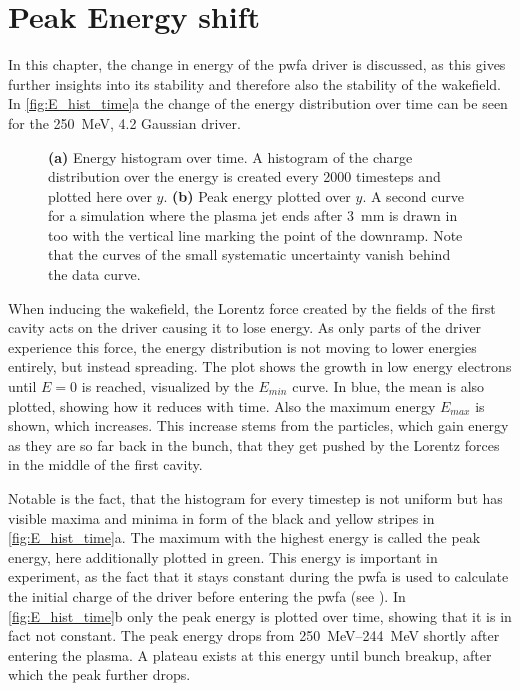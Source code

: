 \documentclass[bachelor_thesis]{subfiles}
\begin{document}
\section{Peak Energy shift} \label{chap:E_shift}
In this chapter, the change in energy of the \gls{pwfa} driver is discussed, as this gives further insights into its stability and therefore also the stability of the wakefield.
In \autoref{fig:E_hist_time}a the change of the energy distribution over time can be seen for the \qty{250}{\MeV}, \qty{4.2}{\mrad} Gaussian driver.
\begin{figure}
	\centering
	
	\caption{
	\textbf{(a)} Energy histogram over time. A histogram of the charge distribution over the energy is created every 2000 timesteps and plotted here over $y$.
	\textbf{(b)} Peak energy plotted over $y$. A second curve for a simulation where the plasma jet ends after \qty{3}{\mm} is drawn in too with the vertical line marking the point of the downramp. Note that the curves of the small systematic uncertainty vanish behind the data curve.}
	\label{fig:E_hist_time}
\end{figure}
When inducing the wakefield, the Lorentz force created by the fields of the first cavity acts on the driver causing it to lose energy. As only parts of the driver experience this force, the energy distribution is not moving to lower energies entirely, but instead spreading.
The plot shows the growth in low energy electrons until $E=0$ is reached, visualized by the $E_{min}$ curve. In blue, the mean is also plotted, showing how it reduces with time. Also the maximum energy $E_{max}$ is shown, which increases.
This increase stems from the particles, which gain energy as they are so far back in the bunch, that they get pushed by the Lorentz forces in the middle of the first cavity.

Notable is the fact, that the histogram for every timestep is not uniform but has visible maxima and minima in form of the black and yellow stripes in \autoref{fig:E_hist_time}a. The maximum with the highest energy is called the peak energy, here additionally plotted in green.
This energy is important in experiment, as the fact that it stays constant during the \gls{pwfa} is used to calculate the initial charge of the driver before entering the \gls{pwfa} (see \cite{Schoebel2022}).
In \autoref{fig:E_hist_time}b only the peak energy is plotted over time, showing that it is in fact not constant. The peak energy drops from \qtyrange{250}{244}{\MeV} shortly after entering the plasma.
A plateau exists at this energy until bunch breakup, after which the peak further drops.
\end{document}
